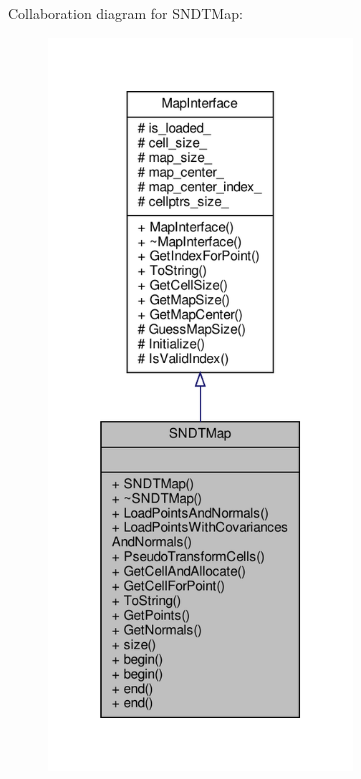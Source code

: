 Collaboration diagram for S\+N\+D\+T\+Map\+:\nopagebreak
\begin{figure}[H]
\begin{center}
\leavevmode
\includegraphics[height=550pt]{d1/d44/classSNDTMap__coll__graph}
\end{center}
\end{figure}
